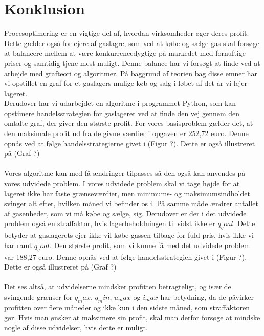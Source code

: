 \chapter{Konklusion}
Procesoptimering er en vigtige del af, hvordan virksomheder øger deres profit. Dette gælder også for ejere af gaslagre, som ved at købe og sælge gas skal forsøge at balancere mellem at være konkurrencedygtige på markedet med fornuftige priser og samtidig tjene mest muligt. Denne balance har vi forsøgt at finde ved at arbejde med grafteori og algoritmer. På baggrund af teorien bag disse emner har vi opstillet en graf for et gaslagers mulige køb og salg i løbet af det år vi lejer lageret. \\Derudover har vi udarbejdet en algoritme i programmet Python, som kan opstimere handelsstrategien for gaslageret ved at finde den vej gennem den omtalte graf, der giver den største profit. For vores basisproblem gælder det, at den maksimale profit ud fra de givne værdier i opgaven er 252,72 euro. Denne opnås ved at følge handelsstrategierne givet i (Figur ?). Dette er også illustreret på (Graf ?) \\
\\
Vores algoritme kan med få ændringer tilpasses så den også kan anvendes på vores udvidede problem. I vores udvidede problem skal vi tage højde for at lageret ikke har faste grænseværdier, men minimums- og maksimumsindholdet svinger alt efter, hvilken måned vi befinder os i. På samme måde ændrer antallet af gasenheder, som vi må købe og sælge, sig. Derudover er der i det udvidede problem også en straffaktor, hvis lagerbeholdningen til sidst ikke er $q_goal$. Dette betyder at gaslagerets ejer ikke vil købe gassen tilbage for fuld pris, hvis ikke vi har ramt $q_goal$. Den største profit, som vi kunne få med det udvidede problem var 188,27 euro. Denne opnås ved at følge handelsstrategien givet i (Figur ?). Dette er også illustreret på (Graf ?)
\\
\\
Det ses altså, at udvidelserne mindsker profitten betragteligt, og især de svingende grænser for $q_max$, $q_min$, $u_max$ og $i_max$ har betydning, da de påvirker profitten over flere måneder og ikke kun i den sidste måned, som straffaktoren gør. Hvis man ønsker at maksimere sin profit, skal man derfor forsøge at mindske nogle af disse udvidelser, hvis dette er muligt.


